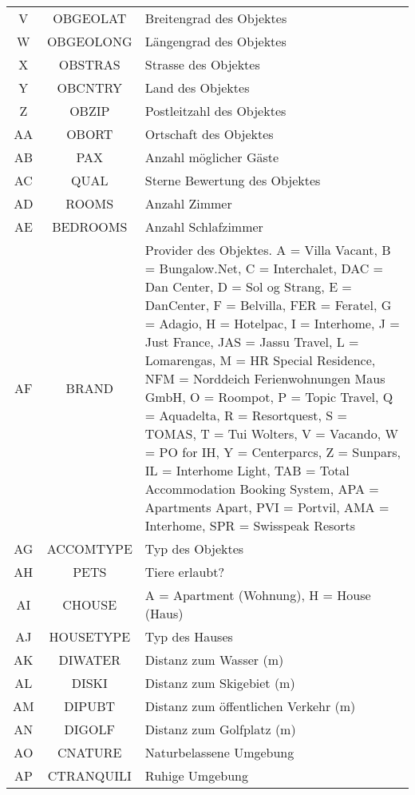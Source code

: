 \begin{longtable}{ | c | c | L{10cm} |}
	 \\ \hline
	V & OBGEOLAT & Breitengrad des Objektes \\ \hline 
	W & OBGEOLONG & Längengrad des Objektes \\ \hline 
	X & OBSTRAS & Strasse des Objektes \\ \hline 
	Y & OBCNTRY & Land des Objektes \\ \hline 
	Z & OBZIP & Postleitzahl des Objektes \\ \hline 
	AA & OBORT & Ortschaft des Objektes \\ \hline 
	AB & PAX & Anzahl möglicher Gäste \\ \hline 
	AC & QUAL & Sterne Bewertung des Objektes \\ \hline 
	AD & ROOMS & Anzahl Zimmer \\ \hline 
	AE & BEDROOMS & Anzahl Schlafzimmer \\ \hline 
	AF & BRAND & Provider des Objektes. A = Villa Vacant, B = Bungalow.Net, C = Interchalet, DAC = Dan Center, D = Sol og Strang, E = DanCenter, F = Belvilla, FER = Feratel, G = Adagio, H = Hotelpac, I = Interhome, J = Just France, JAS = Jassu Travel, L = Lomarengas, M = HR Special Residence, NFM = Norddeich Ferienwohnungen Maus GmbH, O = Roompot, P = Topic Travel, Q = Aquadelta, R = Resortquest, S = TOMAS, T = Tui Wolters, V = Vacando, W = PO for IH, Y = Centerparcs, Z = Sunpars, IL = Interhome Light, TAB = Total Accommodation Booking System, APA = Apartments Apart, PVI = Portvil, AMA = Interhome, SPR = Swisspeak Resorts\\ \hline 
	AG & ACCOMTYPE & Typ des Objektes\\ \hline 
	AH & PETS & Tiere erlaubt? \\ \hline 
	AI & CHOUSE & A = Apartment (Wohnung), H = House (Haus) \\ \hline 
	AJ & HOUSETYPE & Typ des Hauses \\ \hline 
	AK & DIWATER & Distanz zum Wasser (m) \\ \hline 
	AL & DISKI & Distanz zum Skigebiet (m) \\ \hline 
	AM & DIPUBT & Distanz zum öffentlichen Verkehr (m) \\ \hline 
	AN & DIGOLF & Distanz zum Golfplatz (m) \\ \hline 
	AO & CNATURE & Naturbelassene Umgebung \\ \hline 
	AP & CTRANQUILI & Ruhige Umgebung \\ \hline 

\end{longtable}
